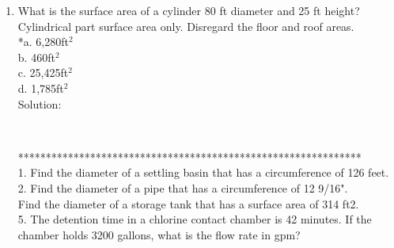 \documentclass{article}
\begin{document}
\begin{enumerate}
\item What is the surface area of a cylinder 80 ft diameter and 25 ft height?  Cylindrical part surface area only. Disregard the floor and roof areas.\\
*a.	6,280ft$^2$\\
b.	460ft$^2$\\
c.	25,425ft$^2$\\
d.	1,785ft$^2$\\
Solution:\\
\begin{center}
\\

\end{center}
**************************************************************\\
1. Find the diameter of a settling basin that has a circumference of 126 feet.\\

2. Find the diameter of a pipe that has a circumference of 12 9/16".\\

Find the diameter of a storage tank that has a surface area of 314 ft2.\\

5. The detention time in a chlorine contact chamber is 42 minutes. If the chamber holds 3200 gallons, what is the flow rate in gpm?\\


\end{enumerate}
\end{document}
